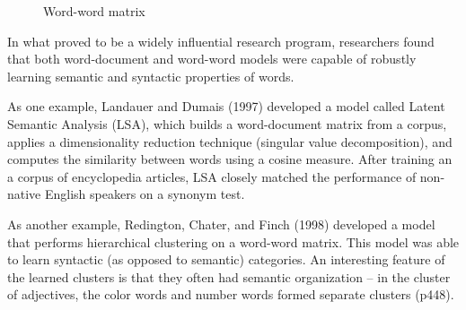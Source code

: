 \documentclass[man,floatsintext]{apa6}
\begin{document}
\begin{figure}
  \begin{center}
    \footnotesize{}
    \caption{Word-word matrix}
    \label{matrix-word-word}
  \end{center}
\end{figure}

In what proved to be a widely influential research program,
researchers found that both word-document and word-word models were
capable of robustly learning semantic and syntactic properties of words.

As one example, Landauer and Dumais (1997) developed a model called
Latent Semantic Analysis (LSA), which builds a word-document
matrix from a corpus, applies a dimensionality reduction technique
(singular value decomposition), and computes the similarity between
words using a cosine measure. After training an a corpus of
encyclopedia articles, LSA closely matched the performance of
non-native English speakers on a synonym test.

As another example, Redington, Chater, and Finch (1998) developed a
model that performs hierarchical clustering on a word-word
matrix. This model was able to learn syntactic (as opposed to
semantic) categories. An interesting feature of the learned clusters
is that they often had semantic organization -- in the cluster of
adjectives, the color words and number words formed separate clusters
(p448).
\end{document}

